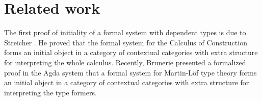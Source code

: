 \documentclass{lmcs}
\newcommand{\s}{\mathrm{s}}
\newcommand{\Ta}{\mathrm{T}}
\newcommand{\Tan}{\Ta_n}
\newcommand{\Un}{\U_n}
\newcommand{\Level}{\mathrm{Level}}
\def\Ctx{\mathrm{Ctx}}
\begin{document}
%
%

\section{Related work}



The first proof of initiality of a formal system with dependent types is due to Streicher \cite{streicher:semtt}. He proved that the formal system for the Calculus of Construction forms an initial object in a category of contextual categories with extra structure for interpreting the whole calculus. Recently, Brunerie \cite{brunerie:initiality} presented a formalized proof in the Agda system that a formal system for Martin-Löf type theory forms an initial object in a category of contextual categories with extra structure for interpreting
the type formers.
\end{document}
